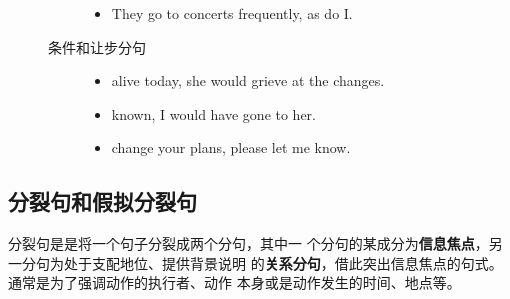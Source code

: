 \begin{description}
\begin{description}
\begin{itemize}
    \item They go to concerts frequently, as do I.

    \end{itemize}

  \item[条件和让步分句]
    \begin{itemize}
    \item {}  alive today, she would grieve at the changes.
    \item {}  known, I would have gone to her.
    \item {}  change your plans, please let me know.
    \end{itemize}
  \end{description}
\end{description}

\subsection{分裂句和假拟分裂句}
\label{subsec:cleftsen}

 分裂句是是将一个句子分裂成两个分句，其中一
个分句的某成分为\textbf{信息焦点}，另一分句为处于支配地位、提供背景说明
的\textbf{关系分句}，借此突出信息焦点的句式。通常是为了强调动作的执行者、动作
本身或是动作发生的时间、地点等。


